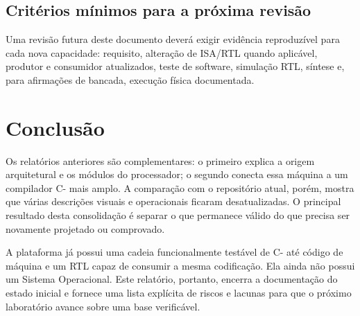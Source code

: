\documentclass[
  12pt,
  oneside,
  a4paper,
  english,
  french,
  spanish,
  brazilian,
]{abntex2}
\begin{document}
\section{Critérios mínimos para a próxima revisão}

Uma revisão futura deste documento deverá exigir evidência reproduzível para cada nova capacidade: requisito, alteração de ISA/RTL quando aplicável, produtor e consumidor atualizados, teste de software, simulação RTL, síntese e, para afirmações de bancada, execução física documentada.

\chapter{Conclusão}
\label{cap:conclusao}

Os relatórios anteriores são complementares: o primeiro explica a origem arquitetural e os módulos do processador; o segundo conecta essa máquina a um compilador C- mais amplo. A comparação com o repositório atual, porém, mostra que várias descrições visuais e operacionais ficaram desatualizadas. O principal resultado desta consolidação é separar o que permanece válido do que precisa ser novamente projetado ou comprovado.

A plataforma já possui uma cadeia funcionalmente testável de C- até código de máquina e um RTL capaz de consumir a mesma codificação. Ela ainda não possui um Sistema Operacional. Este relatório, portanto, encerra a documentação do estado inicial e fornece uma lista explícita de riscos e lacunas para que o próximo laboratório avance sobre uma base verificável.

\postextual


\end{document}
